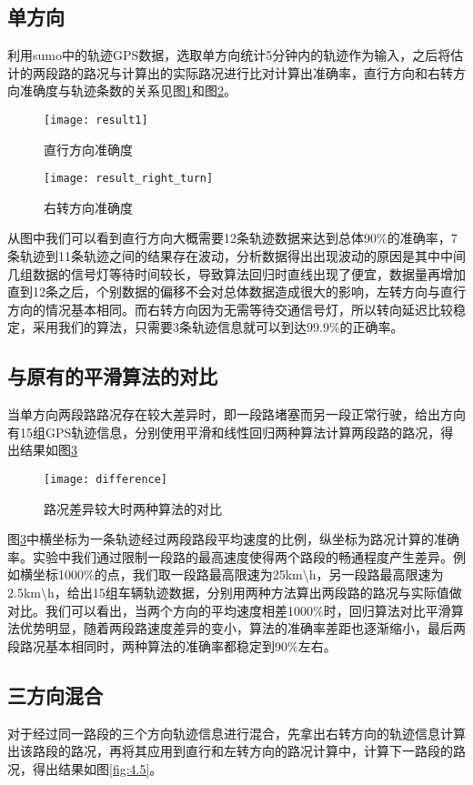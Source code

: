 \subsection{单方向}
利用sumo中的轨迹GPS数据，选取单方向统计5分钟内的轨迹作为输入，之后将估计的两段路的路况与计算出的实际路况进行比对计算出准确率，直行方向和右转方向准确度与轨迹条数的关系见图\ref{fig:4.3}和图\ref{fig:4.4}。

\begin{figure}[H] 
  \centering
  \texttt{[image: result1]}
  \caption{直行方向准确度}
  \label{fig:4.3}
\end{figure}

\begin{figure}[H] 
  \centering
  \texttt{[image: result\_right\_turn]}
  \caption{右转方向准确度}
  \label{fig:4.4}
\end{figure}

从图中我们可以看到直行方向大概需要12条轨迹数据来达到总体90\%的准确率，7条轨迹到11条轨迹之间的结果存在波动，分析数据得出出现波动的原因是其中中间几组数据的信号灯等待时间较长，导致算法回归时直线出现了便宜，数据量再增加直到12条之后，个别数据的偏移不会对总体数据造成很大的影响，左转方向与直行方向的情况基本相同。而右转方向因为无需等待交通信号灯，所以转向延迟比较稳定，采用我们的算法，只需要3条轨迹信息就可以到达99.9\%的正确率。

\subsection{与原有的平滑算法的对比}
当单方向两段路路况存在较大差异时，即一段路堵塞而另一段正常行驶，给出方向有15组GPS轨迹信息，分别使用平滑和线性回归两种算法计算两段路的路况，得出结果如图\ref{fig:4.7}
\begin{figure}[H] 
  \centering
  \texttt{[image: difference]}
  \caption{路况差异较大时两种算法的对比}
  \label{fig:4.7}
\end{figure}
图\ref{fig:4.7}中横坐标为一条轨迹经过两段路段平均速度的比例，纵坐标为路况计算的准确率。实验中我们通过限制一段路的最高速度使得两个路段的畅通程度产生差异。例如横坐标1000\%的点，我们取一段路最高限速为25km\textbackslash h，另一段路最高限速为2.5km\textbackslash h，给出15组车辆轨迹数据，分别用两种方法算出两段路的路况与实际值做对比。我们可以看出，当两个方向的平均速度相差1000\%时，回归算法对比平滑算法优势明显，随着两段路速度差异的变小，算法的准确率差距也逐渐缩小，最后两段路况基本相同时，两种算法的准确率都稳定到90\%左右。

\subsection{三方向混合}
对于经过同一路段的三个方向轨迹信息进行混合，先拿出右转方向的轨迹信息计算出该路段的路况，再将其应用到直行和左转方向的路况计算中，计算下一路段的路况，得出结果如图\ref{fig:4.5}。

